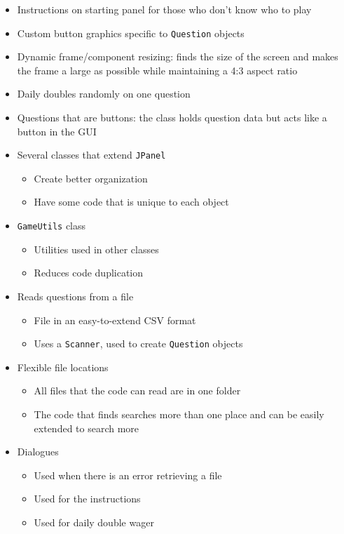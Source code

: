 \documentclass{article}
\begin{document}
\begin{itemize}
\item Instructions on starting panel for those who don't know who to play
\item Custom button graphics specific to \texttt{Question} objects
\item Dynamic frame/component resizing: finds the size of the screen
  and makes the frame a large as possible while maintaining a 4:3
  aspect ratio
\item Daily doubles randomly on one question
\item Questions that are buttons: the class holds question data but
  acts like a button in the GUI
\item Several classes that extend \texttt{JPanel}
  \begin{itemize}
  \item Create better organization
  \item Have some code that is unique to each object
  \end{itemize}
\item \texttt{GameUtils} class
  \begin{itemize}
  \item Utilities used in other classes
  \item Reduces code duplication
  \end{itemize}
\item Reads questions from a file
  \begin{itemize}
  \item File in an easy-to-extend CSV format
  \item Uses a \texttt{Scanner}, used to create \texttt{Question}
    objects
  \end{itemize}
\item Flexible file locations
  \begin{itemize}
  \item All files that the code can read are in one folder
  \item The code that finds searches more than one place and can be
    easily extended to search more
  \end{itemize}
\item Dialogues
  \begin{itemize}
  \item Used when there is an error retrieving a file
  \item Used for the instructions
  \item Used for daily double wager
  \end{itemize}
\end{itemize}
\end{document}
